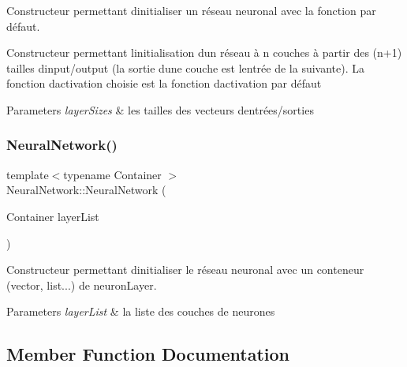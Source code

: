 Constructeur permettant d\textquotesingle{}initialiser un réseau neuronal avec la fonction par défaut. 

Constructeur permettant l\textquotesingle{}initialisation d\textquotesingle{}un réseau à n couches à partir des (n+1) tailles d\textquotesingle{}input/output (la sortie d\textquotesingle{}une couche est l\textquotesingle{}entrée de la suivante). La fonction d\textquotesingle{}activation choisie est la fonction d\textquotesingle{}activation par défaut 
\begin{DoxyParams}{Parameters}
{\em layer\+Sizes} & les tailles des vecteurs d\textquotesingle{}entrées/sorties \\
\hline
\end{DoxyParams}
\mbox{\label{classNeuralNetwork_a7943bb4e9cb96aae048b236d4f1dd979}} 
\subsubsection{\texorpdfstring{Neural\+Network()}{NeuralNetwork()}\hspace{0.1cm}{\footnotesize\ttfamily [4/4]}}
{\footnotesize\ttfamily template$<$typename Container $>$ \\
Neural\+Network\+::\+Neural\+Network (\begin{DoxyParamCaption}\item[{Container}]{layer\+List }\end{DoxyParamCaption})}



Constructeur permettant d\textquotesingle{}initialiser le réseau neuronal avec un conteneur (vector, list...) de neuron\+Layer. 


\begin{DoxyParams}{Parameters}
{\em layer\+List} & la liste des couches de neurones \\
\hline
\end{DoxyParams}


\subsection{Member Function Documentation}
\mbox{\label{classNeuralNetwork_a98cab3b3726fbf06dca316068c29c783}} 
